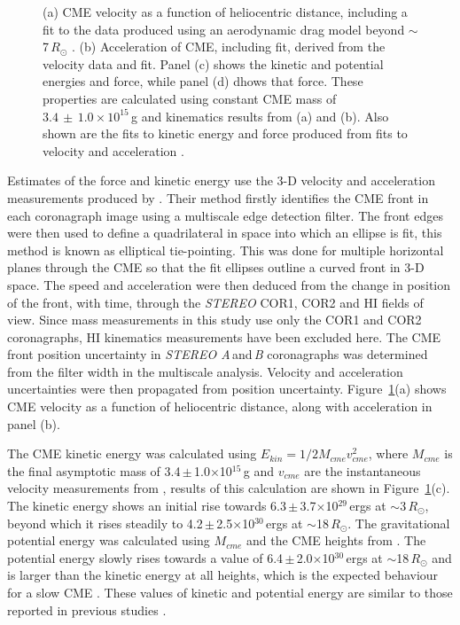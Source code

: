 \begin{figure}[t!]
\begin{center}
\caption[CME kinematics and energetics as a function of height]{(a) CME velocity as a function of heliocentric distance, including a fit to the data produced using an aerodynamic drag model beyond $\sim$7\,$R_{\odot}$ \citep{byrne2010}. (b) Acceleration of CME, including fit,  derived from the velocity data and fit. 
Panel (c) shows the kinetic and potential energies and force, while panel (d) dhows that force. These properties are calculated using constant CME mass of $3.4\,\pm\,1.0\times10^{15}$\,g and kinematics results from (a) and (b). Also shown are the fits to kinetic energy and force produced from fits to velocity and acceleration \citep{carley2012}.}
\label{fig:force_20081212}
\end{center}
\end{figure}
Estimates of the force and kinetic energy use the 3-D velocity and acceleration measurements produced by \citet{byrne2010}. Their method firstly identifies the CME front in each coronagraph image using a multiscale edge detection filter. The front edges were then used to define a quadrilateral in space into which an ellipse is fit, this method is known as elliptical tie-pointing. This was done for multiple horizontal planes through the CME so that the fit ellipses outline a curved front in 3-D space. The speed and acceleration were then deduced from the change in position of the front, with time, through the \emph{STEREO} COR1, COR2 and HI fields of view. Since mass measurements in this study use only the COR1 and COR2 coronagraphs, HI kinematics measurements have been excluded here. The CME front position uncertainty in \emph{STEREO A}\,and\,\emph{B} coronagraphs was determined from the filter width in the multiscale analysis. Velocity and acceleration uncertainties were then propagated from position uncertainty.  Figure~\ref{fig:force_20081212}(a) shows CME velocity as a function of heliocentric distance, along with acceleration in panel (b). 


The CME kinetic energy was calculated using $E_{kin}=1/2M_{cme}v_{cme}^{2}$, where $M_{cme}$ is the final asymptotic mass of 3.4\,$\pm$\,1.0$\times$10$^{15}$\,g and $v_{cme}$ are the instantaneous velocity measurements from \citet{byrne2010}, results of this calculation are shown in Figure~\ref{fig:force_20081212}(c). The kinetic energy shows 
an initial rise towards 6.3\,$\pm$\,3.7$\times$10$^{29}$\,ergs at $\sim$3\,$R_{\odot}$, beyond which it rises steadily to 4.2\,$\pm$\,2.5$\times$10$^{30}$\,ergs at $\sim$18\,$R_{\odot}$. The gravitational potential energy was calculated using $M_{cme}$ and the CME heights from \citet{byrne2010}. The potential energy slowly rises towards a value of 6.4\,$\pm$\,2.0$\times$10$^{30}$\,ergs at $\sim$18\,$R_{\odot}$ and is larger than the kinetic energy at all heights, which is the expected behaviour for a slow CME \citep{vou00}. These values of kinetic and potential energy are similar to those reported in previous studies \citep{emslie2004, vour2010}. 

